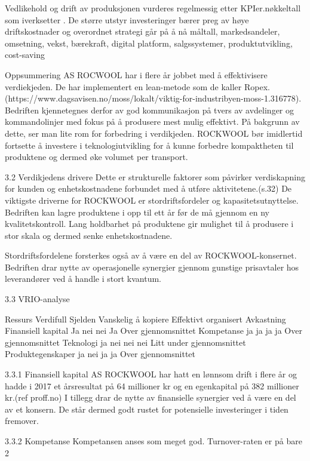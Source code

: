 Vedlikehold og drift av produksjonen vurderes regelmessig etter KPIer.nøkkeltall som iverksetter . De større utstyr investeringer bærer preg av høye driftskostnader og overordnet strategi går på å nå måltall, markedsandeler, omsetning, vekst, bærekraft, digital platform, salgssystemer, produktutvikling, cost-saving
  
Oppsummering
AS ROCWOOL har i flere år jobbet med å effektivisere verdiekjeden. De har implementert en lean-metode som de kaller Ropex. (https://www.dagsavisen.no/moss/lokalt/viktig-for-industribyen-moss-1.316778).
Bedriften kjennetegnes derfor av god kommunikasjon på tvers av avdelinger og kommandolinjer med fokus på å produsere mest mulig effektivt. På bakgrunn av dette, ser man lite rom for forbedring i verdikjeden. ROCKWOOL bør imidlertid fortsette å investere i teknologiutvikling for å kunne forbedre kompaktheten til produktene og dermed øke volumet per transport.

3.2 Verdikjedens drivere
Dette er strukturelle faktorer som påvirker verdiskapning for kunden og enhetskostnadene forbundet med å utføre aktivitetene.(s.32) De viktigste driverne for ROCKWOOL er stordriftsfordeler og kapasitetsutnyttelse. Bedriften kan lagre produktene i opp til ett år før de må gjennom en ny kvalitetskontroll. Lang holdbarhet på produktene gir mulighet til å produsere i stor skala og dermed senke enhetskostnadene.

Stordriftsfordelene forsterkes også av å være en del av ROCKWOOL-konsernet. Bedriften drar nytte av operasjonelle synergier gjennom gunstige prisavtaler hos leverandører ved å handle i stort kvantum.

3.3 VRIO-analyse

Ressurs
Verdifull
Sjelden
Vanskelig å kopiere
Effektivt organisert
Avkastning
Finansiell kapital
Ja
nei
nei
Ja
Over gjennomsnittet
Kompetanse
ja
ja
ja
ja
Over gjennomsnittet
Teknologi
ja
nei
nei
nei
Litt under gjennomsnittet
Produktegenskaper
ja
nei
ja
ja
Over gjennomsnittet

3.3.1 Finansiell kapital
AS ROCKWOOL har hatt en lønnsom drift i flere år og hadde i 2017 et årsresultat på 64 millioner kr og en egenkapital på 382 millioner kr.(ref proff.no) I tillegg drar de nytte av finansielle synergier ved å være en del av et konsern. De står dermed godt rustet for potensielle investeringer i tiden fremover.

3.3.2 Kompetanse
Kompetansen anses som meget god. Turnover-raten er på bare 2%


